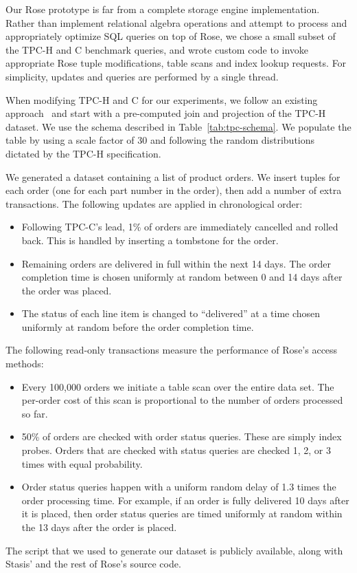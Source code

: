\documentclass{vldb}
\newcommand{\rows}{Rose\xspace}
\newcommand{\rowss}{Rose's\xspace}
\begin{document}
Our \rows prototype is far from a complete storage engine
implementation.  Rather than implement relational algebra operations
and attempt to process and appropriately optimize SQL queries on top
of \rows, we chose a small subset of the TPC-H and C benchmark
queries, and wrote custom code to invoke appropriate \rows tuple
modifications, table scans and index lookup requests.  For simplicity,
updates and queries are performed by a single thread.

When modifying TPC-H and C for our experiments, we follow an existing
approach~\cite{entropy,bitsForChronos} and start with a pre-computed
join and projection of the TPC-H dataset.  We use the schema described
in Table~\ref{tab:tpc-schema}.  We populate the table by using a scale
factor of 30 and following the random distributions dictated by the
TPC-H specification.

We generated a dataset containing a list of product orders.  We insert
tuples for each order (one for each part number in the order), then
add a number of extra transactions.  The following updates are applied in chronological order:

\begin{itemize}
\item Following TPC-C's lead, 1\% of orders are immediately cancelled
  and rolled back.  This is handled by inserting a tombstone for the
  order.
\item Remaining orders are delivered in full within the next 14 days.
  The order completion time is chosen uniformly at random between 0
  and 14 days after the order was placed.
\item  The status of each line item is changed to ``delivered'' at a time
  chosen uniformly at random before the order completion time.
\end{itemize}
The following read-only transactions measure the performance of \rowss
access methods:
\begin{itemize}
\item Every 100,000 orders we initiate a table scan over the entire
  data set.  The per-order cost of this scan is proportional to the
  number of orders processed so far.
\item 50\% of orders are checked with order status queries.  These are
  simply index probes.  Orders that are checked with status queries
  are checked 1, 2, or 3 times with equal probability.
\item Order status queries happen with a uniform random delay of 1.3
  times the order processing time.  For example, if an order
  is fully delivered 10 days after it is placed, then order status queries are
  timed uniformly at random within the 13 days after the order is
  placed.
\end{itemize}
The script that we used to generate our dataset is publicly available,
along with Stasis' and the rest of \rowss source code.
\end{document}
